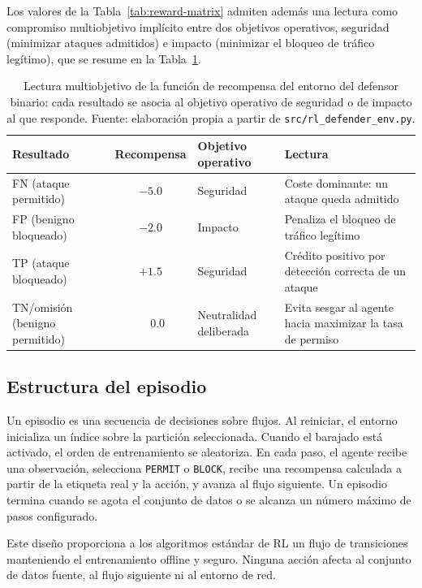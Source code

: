 Los valores de la Tabla~\ref{tab:reward-matrix} admiten además una lectura como compromiso multiobjetivo implícito entre dos objetivos operativos, seguridad (minimizar ataques admitidos) e impacto (minimizar el bloqueo de tráfico legítimo), que se resume en la Tabla~\ref{tab:recompensa-multiobjetivo}.

\begin{table}[htbp]
\centering
\begin{tabular}{p{2.9cm}cp{2.6cm}p{3.9cm}}
\toprule
Resultado & Recompensa & Objetivo operativo & Lectura \\
\midrule
FN (ataque permitido) & $-5.0$ & Seguridad & Coste dominante: un ataque queda admitido \\
FP (benigno bloqueado) & $-2.0$ & Impacto & Penaliza el bloqueo de tráfico legítimo \\
TP (ataque bloqueado) & $+1.5$ & Seguridad & Crédito positivo por detección correcta de un ataque \\
TN/omisión (benigno permitido) & $\phantom{-}0.0$ & Neutralidad deliberada & Evita sesgar al agente hacia maximizar la tasa de permiso \\
\bottomrule
\end{tabular}
\caption[Lectura multiobjetivo de la función de recompensa]{Lectura multiobjetivo de la función de recompensa del entorno del defensor binario: cada resultado se asocia al objetivo operativo de seguridad o de impacto al que responde. Fuente: elaboración propia a partir de \texttt{src/rl\_defender\_env.py}.}
\label{tab:recompensa-multiobjetivo}
\end{table}

\subsection{Estructura del episodio}
Un episodio es una secuencia de decisiones sobre flujos. Al reiniciar, el entorno inicializa un índice sobre la partición seleccionada. Cuando el barajado está activado, el orden de entrenamiento se aleatoriza. En cada paso, el agente recibe una observación, selecciona \texttt{PERMIT} o \texttt{BLOCK}, recibe una recompensa calculada a partir de la etiqueta real y la acción, y avanza al flujo siguiente. Un episodio termina cuando se agota el conjunto de datos o se alcanza un número máximo de pasos configurado.

Este diseño proporciona a los algoritmos estándar de RL un flujo de transiciones manteniendo el entrenamiento offline y seguro. Ninguna acción afecta al conjunto de datos fuente, al flujo siguiente ni al entorno de red.

